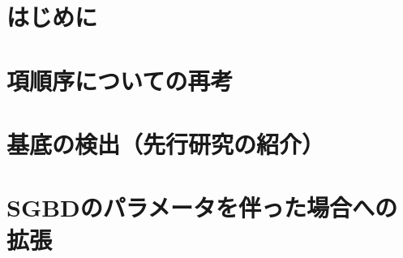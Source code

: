 





	
	

	\tableofcontents

	\chapter{はじめに}\label{chapter01:chapter_num}
	
	\chapter{項順序についての再考}\label{chapter02:chapter_num}

	\chapter{\groebner{}基底の検出（先行研究の紹介）}\label{chapter03:chapter_num}

	\chapter{SGBDのパラメータを伴った場合への拡張}\label{chapter04:chapter_num}



	

